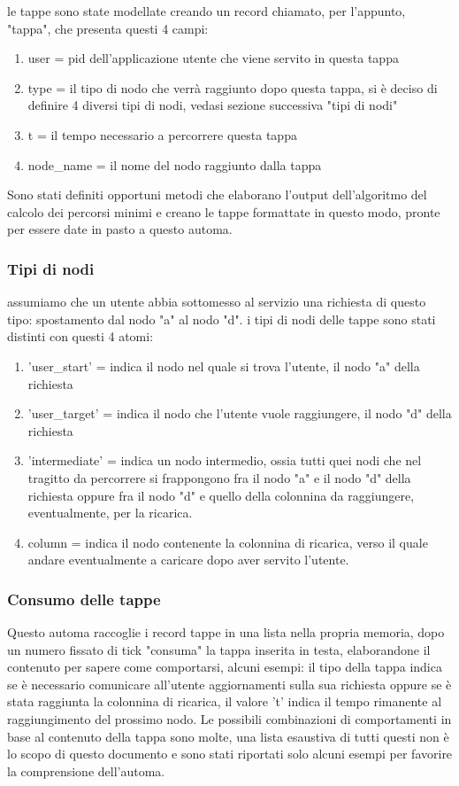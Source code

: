 le tappe sono state modellate creando un record chiamato, per l'appunto, "tappa", che presenta questi 4 campi:

\begin{enumerate}
	\item user = pid dell'applicazione utente che viene servito in questa tappa
	\item type = il tipo di nodo che verrà raggiunto dopo questa tappa, si è deciso di definire 4 diversi tipi di nodi, vedasi sezione successiva "tipi di nodi"
	\item t = il tempo necessario a percorrere questa tappa
	\item node\_name = il nome del nodo raggiunto dalla tappa
\end{enumerate}
Sono stati definiti opportuni metodi che elaborano l'output dell'algoritmo del calcolo dei percorsi minimi e creano le tappe formattate in questo modo, pronte per essere date in pasto a questo automa.

\subsubsection{Tipi di nodi} \label{tipiTappe}

assumiamo che un utente abbia sottomesso al servizio una richiesta di questo tipo: spostamento dal nodo "a" al nodo "d".
i tipi di nodi delle tappe sono stati distinti con questi 4 atomi:

\begin{enumerate}
	\item 'user\_start' = indica il nodo nel quale si trova l'utente, il nodo "a" della richiesta
	\item 'user\_target' =  indica il nodo che l'utente vuole raggiungere, il nodo "d" della richiesta
	\item 'intermediate' =  indica un nodo intermedio, ossia tutti quei nodi che nel tragitto da percorrere si frappongono fra il nodo "a" e il nodo "d" della richiesta oppure fra il nodo "d" e quello della colonnina da raggiungere, eventualmente, per la ricarica.
	\item column = indica il nodo contenente la colonnina di ricarica, verso il quale andare eventualmente a caricare dopo aver servito l'utente.
\end{enumerate}

\subsubsection{Consumo delle tappe} \label{consumo tappe}
Questo automa raccoglie i record tappe in una lista nella propria memoria, dopo un numero fissato di tick "consuma" la  tappa inserita in testa, elaborandone il contenuto per sapere come comportarsi, alcuni esempi: il tipo della tappa indica se è necessario comunicare all'utente aggiornamenti sulla sua richiesta oppure se è stata raggiunta la colonnina di ricarica, il valore 't' indica il tempo rimanente al raggiungimento del prossimo nodo.
Le possibili combinazioni di comportamenti in base al contenuto della tappa sono molte, una lista esaustiva di tutti questi non è lo scopo di questo documento e sono stati riportati solo alcuni esempi per favorire la comprensione dell'automa.

